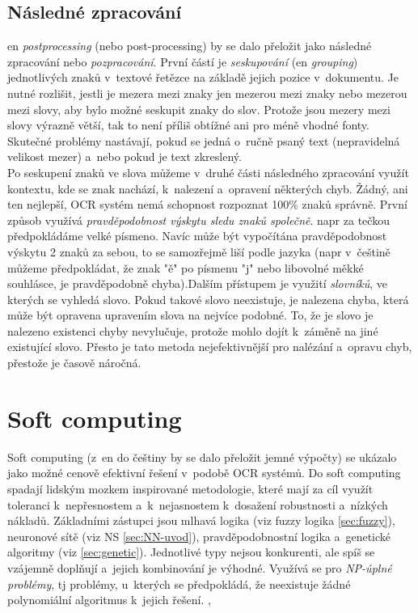 \documentclass[12pt,oneside]{report}			%
\begin{document}
	\subsection{Následné zpracování}
	\label{sec:postproces}
	\Gls{en} \emph{postprocessing} (nebo post-processing) by se dalo přeložit jako následné zpracování nebo \emph{pozpracování}. První částí je \emph{seskupování} (\gls{en} \emph{grouping}) jednotlivých znaků v~textové řetězce na základě jejich pozice v~dokumentu. Je nutné rozlišit, jestli je mezera mezi znaky jen mezerou mezi znaky nebo mezerou mezi slovy, aby bylo možné seskupit znaky do slov. Protože jsou mezery mezi slovy výrazně větší, tak to není příliš obtížné ani pro méně vhodné fonty. Skutečné problémy nastávají, pokud se jedná o~ručně psaný text (nepravidelná velikost mezer) a~nebo pokud je text zkreslený.\parencite[\gls{s} 20]{eikvil-ocr}\\
	Po seskupení znaků ve slova můžeme v~druhé části následného zpracování využít kontextu, kde se znak nachází, k~nalezení a~opravení některých chyb. Žádný, ani ten nejlepší, \gls{OCR} systém nemá schopnost rozpoznat 100\% znaků správně. První způsob využívá \emph{pravděpodobnost výskytu sledu znaků společně}. \Gls{napr} za tečkou předpokládáme velké písmeno. Navíc může být vypočítána pravděpodobnost výskytu 2 znaků za sebou, to se samozřejmě liší podle jazyka (\gls{napr} v~češtině můžeme předpokládat, že znak "ě" po písmenu "j" nebo libovolné měkké souhlásce, je pravděpodobně chyba).Dalším přístupem je využití \emph{slovníků}, ve kterých se vyhledá slovo. Pokud takové slovo neexistuje, je nalezena chyba, která může být opravena upravením slova na nejvíce podobné. To, že je slovo je nalezeno existenci chyby nevylučuje, protože mohlo dojít k~záměně na jiné existující slovo. Přesto je tato metoda nejefektivnější pro nalézání a~opravu chyb, přestože je časově náročná. \parencite[\gls{str} 20-21]{eikvil-ocr}
	
	\section{Soft computing}
	\label{sec:soft}
	Soft computing (z~\gls{en} do češtiny by se dalo přeložit jemné výpočty) se ukázalo jako možné cenově efektivní řešení v~podobě \gls{OCR} systémů. Do soft computing spadají lidským mozkem inspirované metodologie, které mají za cíl využít toleranci k~nepřesnostem a~k~nejasnostem k~dosažení robustnosti a~nízkých nákladů. Základními zástupci jsou mlhavá logika (\gls{viz} fuzzy logika \ref{sec:fuzzy}), neuronové sítě (\gls{viz} \gls{NS} \ref{sec:NN-uvod}), pravděpodobnostní logika a~genetické algoritmy (\gls{viz} \ref{sec:genetic}). Jednotlivé typy nejsou konkurenti, ale spíš se vzájemně doplňují a~jejich kombinování je výhodné. Využívá se pro \emph{NP-úplné problémy}, \gls{tj} problémy, u~kterých se předpokládá, že neexistuje žádné polynomiální algoritmus k~jejich řešení.  \parencite[\gls{str} 43-45]{eikvil-ocr}, \parencite[\gls{str} 48-49]{soft_fuzzy}
	
\end{document}
